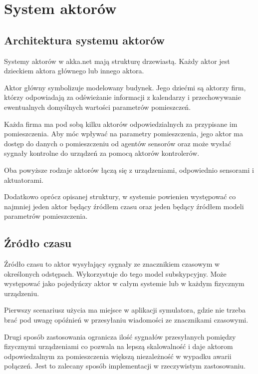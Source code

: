\chapter{System aktorów}\label{ch:aktorzy}
\section{Architektura systemu aktorów}
Systemy aktorów w akka.net mają strukturę drzewiastą. 
Każdy aktor jest dzieckiem aktora głównego lub innego aktora. 



Aktor główny symbolizuje modelowany budynek.
Jego dziećmi są aktorzy firm, którzy odpowiadają za odświeżanie informacji z kalendarzy i przechowywanie ewentualnych domyślnych wartości parametrów pomieszczeń.

Każda firma ma pod sobą kilku aktorów odpowiedzialnych za przypisane im pomieszczenia.
Aby móc wpływać na parametry pomieszczenia, jego aktor ma dostęp do danych o pomieszczeniu od agentów sensorów oraz może wysłać sygnały kontrolne do urządzeń za pomocą aktorów kontrolerów.

Oba powyższe rodzaje aktorów łączą się z urządzeniami, odpowiednio sensorami i aktuatorami.

Dodatkowo oprócz opisanej struktury, w systemie powienien występować co najmniej jeden aktor będący źródłem czasu oraz jeden będący źródłem modeli parametrów pomieszczenia.

\section{Źródło czasu}
Źródło czasu to aktor wysyłający sygnały ze znacznikiem czasowym w określonych odstępach. Wykorzystuje do tego model subskypcyjny. Może występować jako pojedyńczy aktor w całym systemie lub w każdym fizycznym urządzeniu. 



Pierwszy scenariusz użycia ma miejsce w aplikacji symulatora, gdzie nie trzeba brać pod uwagę opóźnień w przesyłaniu wiadomości ze znacznikami czasowymi. 



Drugi sposób zastosowania ogranicza ilość sygnałów przesyłanych pomiędzy fizycznymi urządzeniami co pozwala na lepszą skalowalność i daje aktorom odpowiedzalnym za pomieszczenia większą niezależność w wypadku awarii połączeń. 
Jest to zalecany sposób implementacji w rzeczywistym zastosowaniu.

